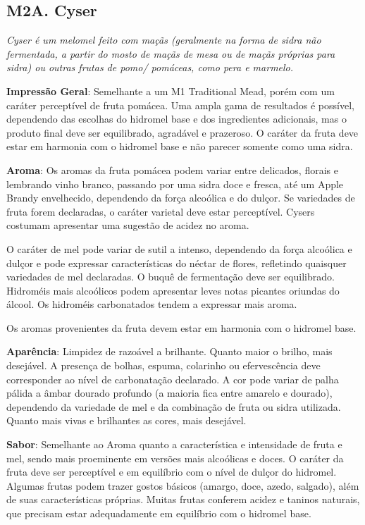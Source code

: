 \subsection*{M2A. Cyser}

\textit{Cyser é um melomel feito com maçãs (geralmente na forma de sidra não fermentada, a partir do mosto de maçãs de mesa ou de maçãs próprias para sidra) ou outras frutas de pomo/ pomáceas, como pera e marmelo.}

\textbf{Impressão Geral}: Semelhante a um M1 Traditional Mead, porém com um caráter perceptível de fruta pomácea. Uma ampla gama de resultados é possível, dependendo das escolhas do hidromel base e dos ingredientes adicionais, mas o produto final deve ser equilibrado, agradável e prazeroso. O caráter da fruta deve estar em harmonia com o hidromel base e não parecer somente como uma sidra.

\textbf{Aroma}: Os aromas da fruta pomácea podem variar entre delicados, florais e lembrando vinho branco, passando por uma sidra doce e fresca, até um Apple Brandy envelhecido, dependendo da força alcoólica e do dulçor. Se variedades de fruta forem declaradas, o caráter varietal deve estar perceptível. Cysers costumam apresentar uma sugestão de acidez no aroma.

O caráter de mel pode variar de sutil a intenso, dependendo da força alcoólica e dulçor e pode expressar características do néctar de flores, refletindo quaisquer variedades de mel declaradas. O buquê de fermentação deve ser equilibrado. Hidroméis mais alcoólicos podem apresentar leves notas picantes oriundas do álcool. Os hidroméis carbonatados tendem a expressar mais aroma.

Os aromas provenientes da fruta devem estar em harmonia com o hidromel base.

\textbf{Aparência}: Limpidez de razoável a brilhante. Quanto maior o brilho, mais desejável. A presença de bolhas, espuma, colarinho ou efervescência deve corresponder ao nível de carbonatação declarado. A cor pode variar de palha pálida a âmbar dourado profundo (a maioria fica entre amarelo e dourado), dependendo da variedade de mel e da combinação de fruta ou sidra utilizada. Quanto mais vivas e brilhantes as cores, mais desejável.

\textbf{Sabor}: Semelhante ao Aroma quanto a característica e intensidade de fruta e mel, sendo mais proeminente em versões mais alcoólicas e doces. O caráter da fruta deve ser perceptível e em equilíbrio com o nível de dulçor do hidromel. Algumas frutas podem trazer gostos básicos (amargo, doce, azedo, salgado), além de suas características próprias. Muitas frutas conferem acidez e taninos naturais, que precisam estar adequadamente em equilíbrio com o hidromel base.

